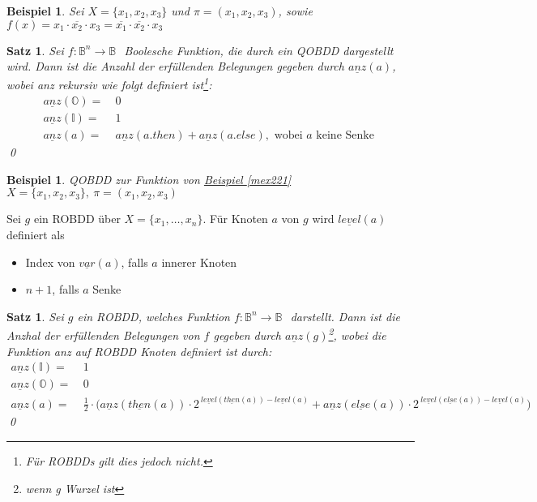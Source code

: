 \documentclass[ngerman]{scrartcl}
\theoremstyle{custom}
\newtheorem{mex}[mdef]{Beispiel}
\newtheorem{ms}[mdef]{Satz}
\newcommand{\0}{\mathbf{0}}
\newcommand{\1}{\mathbf{L}}
\newcommand{\bol}{\mathds{B}^n \rightarrow \mathds{B}}
\newcommand{\bolf}{$f: \bol~$}
\begin{document}
\begin{mex}
  Sei $X = \{x_1,x_2,x_3\}$ und $\pi = (x_1,x_2,x_3)$, sowie $f(x) =
  x_1 \cdot \overline{x_2} \cdot x_3 = \overline{x_1} \cdot
  \overline{x_2} \cdot x_3$
\end{mex}

\begin{ms}\label{sat:anz}
  Sei \bolf ~Boolesche Funktion, die durch ein QOBDD dargestellt
  wird. Dann ist die Anzahl der erf\"ullenden Belegungen gegeben durch
  $\underline{anz}(a)$, wobei anz rekursiv wie folgt definiert
  ist\footnote{F\"ur ROBDDs gilt dies jedoch nicht.}:
  \begin{align*}
    \underline{anz}(\mathds{O}) = & ~0\\
    \underline{anz}(\mathds{I}) = & ~1\\
    \underline{anz}(a) = & ~\underline{anz}(a.then) +
    \underline{anz}(a.else), \text{ wobei } a \text{ keine Senke }
  \end{align*}
\qed
\end{ms}

\begin{mex}
QOBDD zur Funktion von \hyperref[mex221]{Beispiel \ref{mex221}}\\
$X = \{x_1,x_2,x_3\}, ~\pi = (x_1,x_2,x_3)$
\end{mex}

Sei $g$ ein ROBDD \"uber $X = \{x_1, \dots, x_n\}$. F\"ur Knoten $a$
von $g$ wird $\underline{level}(a)$ definiert als 
\begin{itemize}
\item Index von $\underline{var}(a)$, falls $a$ innerer Knoten
\item $n+1$, falls $a$ Senke
\end{itemize}

\begin{ms}
  Sei $g$ ein ROBDD, welches Funktion \bolf ~darstellt. Dann ist die
  Anzhal der erf\"ullenden Belegungen von $f$ gegeben durch
  $\underline{anz}(g)$\footnote{wenn g Wurzel ist}, wobei die Funktion
  anz auf ROBDD Knoten definiert ist durch:
  \begin{align*}
    \underline{anz}(\mathds{I})=& ~1\\
    \underline{anz}(\mathds{O})=& ~0\\
    \underline{anz}(a) =& ~\frac{1}{2} \cdot \biggr(
  \underline{anz}(\underline{then}(a)) \cdot
  2^{~\underline{level}(\underline{then}(a)) - \underline{level}(a)} +
  \underline{anz}(\underline{else}(a)) \cdot
  2^{~\underline{level}(\underline{else}(a)) - \underline{level}(a)} \biggr)
  \end{align*}
\qed
\end{ms}
\end{document}

